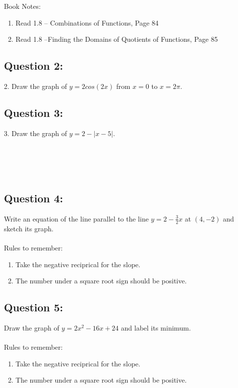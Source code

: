 \documentclass[12pt, letterpaper]{article}
\begin{document}
Book Notes:
\begin{enumerate}
  \item Read 1.8 -- Combinations of Functions, Page 84
    \item Read 1.8 --Finding the Domains of Quotients of Functions, Page 85  
\end{enumerate}

\subsection{Question 2:}
2. Draw the graph of $y=2cos(2x)$ from $x=0$ to $x=2\pi$.

\newpage
\subsection{Question 3:}
3. Draw the graph of $y=2-|x-5|$.
\\\\\\\\\\

\subsection{Question 4:}
Write an equation of the line parallel to the line 
  $y=2-\frac{3}{2}x$ at $(4,-2)$ and sketch its graph.
  \\\\
  Rules to remember:
  \begin{enumerate}
    \item Take the negative reciprical for the slope.
    \item The number under a square root sign should be positive.
  \end{enumerate}

\subsection{Question 5:}
  Draw the graph of $y=2x^2-16x+24$ and label its minimum.
  \\\\
  Rules to remember:
  \begin{enumerate}
    \item Take the negative reciprical for the slope.
    \item The number under a square root sign should be positive.
  \end{enumerate}
\end{document}
